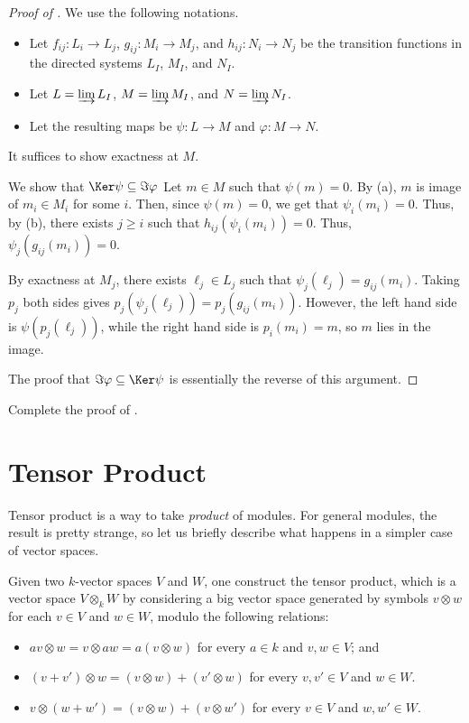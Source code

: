 \begin{proof}[Proof of ]
    We use the following notations.
    \begin{itemize}
    \item Let $f_{ij} : L_i\to L_j$,
    $g_{ij} : M_i\to M_j$, and $h_{ij} : N_i\to N_j$
    be the transition functions in the directed systems
    $L_I$, $M_I$, and $N_I$.
    \item Let $L = \varinjlim L_I$, $M=\varinjlim M_I$,
    and $N=\varinjlim N_I$.
    \item Let the resulting maps
    be $\psi : L\to M$ and $\varphi : M\to N$.
    \end{itemize}
    It suffices to show exactness at $M$.

    We show that $\Ker\psi \subseteq \Im\varphi$
    Let $m\in M$ such that $\psi(m)=0$.
    By  (a), 
    $m$ is image of $m_i\in M_i$ for some $i$.
    Then, since $\psi(m)=0$, we get that $\psi_i(m_i)=0$.
    Thus, by  (b), there exists
    $j\geq i$ such that $h_{ij}(\psi_i(m_i))=0$.
    Thus, $\psi_j(g_{ij}(m_i))=0$.
    
    By exactness at $M_j$, there exists $\ell_j\in L_j$
    such that $\psi_j(\ell_j) = g_{ij}(m_i)$.
    Taking $p_j$ both sides gives 
    $p_j(\psi_j(\ell_j)) = p_j(g_{ij}(m_i))$.
    However, the left hand side is $\psi(p_j(\ell_j))$,
    while the right hand side is $p_i(m_i) = m$,
    so $m$ lies in the image.

    The proof that $\Im\varphi\subseteq\Ker\psi$
    is essentially the reverse of this argument.
\end{proof}
\begin{exercise}
Complete the proof of .
\end{exercise}
%
%
%
%
\section{Tensor Product}
\label{sec:tensor}
Tensor product is a way to take \emph{product} of modules.
For general modules, the result is pretty strange,
so let us briefly describe what happens in a simpler 
case of vector spaces.

Given two $k$-vector spaces $V$ and $W$,
one construct the tensor product,
which is a vector space $V\otimes_k W$ by 
considering a big vector space generated by symbols 
$v\otimes w$ for each $v\in V$ and $w\in W$,
modulo the following relations:
\begin{itemize}
    \item $av\otimes w = v\otimes aw = a(v\otimes w)$
    for every $a\in k$ and $v,w\in V$; and
    \item $(v+v')\otimes w = (v\otimes w) + (v'\otimes w)$
    for every $v,v'\in V$ and $w\in W$.
    \item $v\otimes (w+w') = (v\otimes w) + (v\otimes w')$
    for every $v\in V$ and $w,w'\in W$.
\end{itemize}

